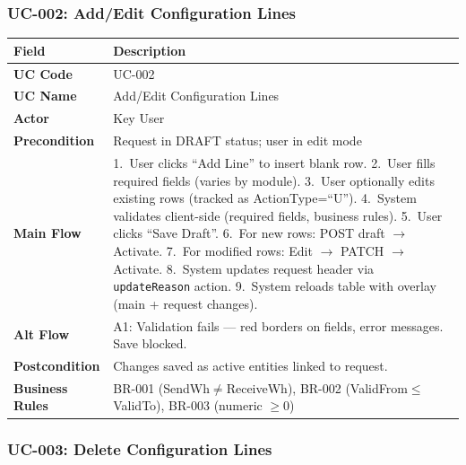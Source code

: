 \documentclass[12pt,a4paper]{report}
\begin{document}
\subsubsection{UC-002: Add/Edit Configuration Lines}

\begin{longtable}{|>{\bfseries}p{2.8cm}|p{12cm}|}
  \hline
  \rowcolor{tableheadpeach}
  \textbf{Field} & \textbf{Description} \\ \hline
  \endhead \hline \endfoot
  UC Code       & UC-002 \\ \hline
  UC Name       & Add/Edit Configuration Lines \\ \hline
  Actor         & Key User \\ \hline
  Precondition  & Request in DRAFT status; user in edit mode \\ \hline
  Main Flow     & 1.~User clicks ``Add Line'' to insert blank row.
                  2.~User fills required fields (varies by module).
                  3.~User optionally edits existing rows (tracked as ActionType=``U'').
                  4.~System validates client-side (required fields, business rules).
                  5.~User clicks ``Save Draft''.
                  6.~For new rows: POST draft $\rightarrow$ Activate.
                  7.~For modified rows: Edit $\rightarrow$ PATCH $\rightarrow$ Activate.
                  8.~System updates request header via \texttt{updateReason} action.
                  9.~System reloads table with overlay (main + request changes). \\ \hline
  Alt Flow      & A1: Validation fails --- red borders on fields, error messages. Save blocked. \\ \hline
  Postcondition & Changes saved as active entities linked to request. \\ \hline
  Business Rules& BR-001 (SendWh$\neq$ReceiveWh), BR-002 (ValidFrom$\leq$ValidTo), BR-003 (numeric $\geq$0) \\ \hline
\end{longtable}

\subsubsection{UC-003: Delete Configuration Lines}
\end{document}
